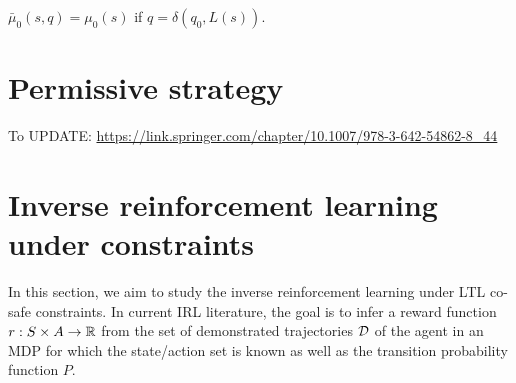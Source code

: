 \documentclass{article}[11pt]
\begin{document}
$\bar \mu_0(s,q) = \mu_0(s)$ if $q = \delta (q_0, L(s))$.

\section{Permissive strategy}






To UPDATE: \url{https://link.springer.com/chapter/10.1007/978-3-642-54862-8_44}
\section{Inverse reinforcement learning under constraints}
In this section, we aim to study the inverse reinforcement learning
under LTL co-safe constraints. In current IRL literature, the goal is
to infer a reward function $r: S\times A\rightarrow \mathbb{R} $ from the
set of demonstrated trajectories $\cal D$ of the agent in an MDP for
which the state/action set is known as well as the transition
probability function $P$.
\end{document}
